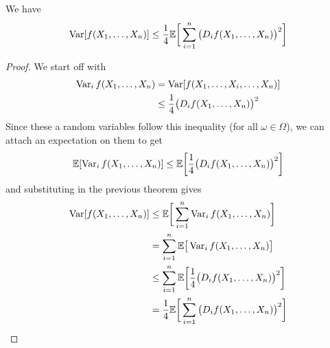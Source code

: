   \begin{corollary}
  We have 
  \[\operatorname{Var}[ f(X_1, \ldots, X_n)] \leq \frac{1}{4} \mathbb{E} \bigg[ \sum_{i=1}^n \big( D_i f(X_1, \ldots, X_n) \big)^2 \bigg] \]
  \end{corollary}
  \begin{proof}
  We start off with 
  \begin{align*}
      \operatorname{Var}_i f (X_1, \ldots, X_n) & = \operatorname{Var}[ f(X_1, \ldots, X_i, \ldots, X_n)] \\
      & \leq \frac{1}{4} \big( D_i f (X_1, \ldots, X_n)\big)^2 
  \end{align*}
  Since these a random variables follow this inequality (for all $\omega \in \Omega$), we can attach an expectation on them to get 
  \[\mathbb{E}[\operatorname{Var}_i f (X_1, \ldots, X_n)] \leq \mathbb{E} \bigg[ \frac{1}{4} \big( D_i f (X_1, \ldots, X_n)\big)^2\bigg] \]
  and substituting in the previous theorem gives 
  \begin{align*}
      \operatorname{Var}[f(X_1, \ldots, X_n)] & \leq \mathbb{E} \bigg[ \sum_{i=1}^n \operatorname{Var}_i f(X_1, \ldots, X_n) \bigg] \\
      & = \sum_{i=1}^n \mathbb{E}\big[ \operatorname{Var}_i f(X_1, \ldots, X_n) \big] \\
      & \leq \sum_{i=1}^n \mathbb{E} \bigg[ \frac{1}{4} \big( D_i f (X_1, \ldots, X_n)\big)^2\bigg] \\
      & = \frac{1}{4} \mathbb{E} \bigg[ \sum_{i=1}^n \big( D_i f(X_1, \ldots, X_n) \big)^2 \bigg] 
  \end{align*}
  \end{proof}

  \begin{example}

  \end{example}



